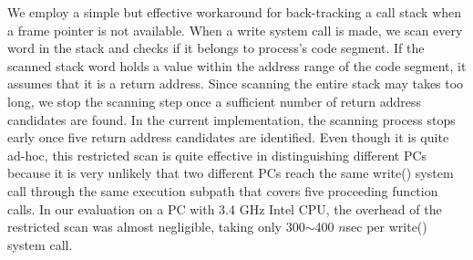 We employ a simple but effective workaround for back-tracking a call stack when
a frame pointer is not available.  When a write system call is made,
we scan every word in the stack
and checks if it belongs to process's code segment.  If the scanned stack word
holds a value within the address range of the code segment, it assumes that it
is a return address.  Since scanning the entire stack may takes too long, we stop
the scanning step once a sufficient number of return address candidates are found.
In the current implementation, the scanning process stops early once 
five return address candidates are identified.  
Even though it is quite ad-hoc, this restricted scan is quite effective
in distinguishing different PCs because it is very unlikely that two different PCs
reach the same write() system call through the same execution subpath 
that covers five proceeding function calls. 
In our evaluation on a PC with 3.4 GHz Intel CPU, the overhead of the
restricted scan was almost negligible, taking only 300$\sim$400 $n$sec per
\textsf{\small write()} system call.

